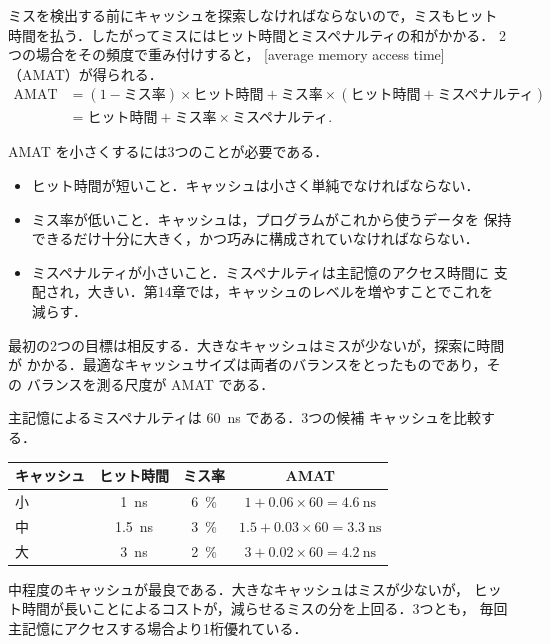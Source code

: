 \documentclass[../main.tex]{subfiles}
\begin{document}
ミスを検出する前にキャッシュを探索しなければならないので，ミスもヒット
時間を払う．したがってミスにはヒット時間とミスペナルティの和がかかる．
2つの場合をその頻度で重み付けすると，
[average memory access time]%
（AMAT）が得られる．
\begin{equation}
  \begin{aligned}
    \text{AMAT}
    &= (1-\text{ミス率}) \times \text{ヒット時間}
       + \text{ミス率} \times (\text{ヒット時間} + \text{ミスペナルティ}) \\
    &= \text{ヒット時間} + \text{ミス率} \times \text{ミスペナルティ} .
  \end{aligned}
  \label{eq:l12-amat}
\end{equation}

AMAT を小さくするには3つのことが必要である．
\begin{itemize}
  \item ヒット時間が短いこと．キャッシュは小さく単純でなければならない．
  \item ミス率が低いこと．キャッシュは，プログラムがこれから使うデータを
    保持できるだけ十分に大きく，かつ巧みに構成されていなければならない．
  \item ミスペナルティが小さいこと．ミスペナルティは主記憶のアクセス時間に
    支配され，大きい．第14章では，キャッシュのレベルを増やすことでこれを
    減らす．
\end{itemize}
最初の2つの目標は相反する．大きなキャッシュはミスが少ないが，探索に時間が
かかる．最適なキャッシュサイズは両者のバランスをとったものであり，その
バランスを測る尺度が AMAT である．

\begin{example}
  \label{ex:l12-amat}
  主記憶によるミスペナルティは \SI{60}{\nano\second} である．3つの候補
  キャッシュを比較する．
  \begin{center}\small
    \begin{tabular}{@{}lccc@{}}
      \toprule
      キャッシュ & ヒット時間 & ミス率 & AMAT \\
      \midrule
      小 & \SI{1}{\nano\second}   & \SI{6}{\percent} & $1 + 0.06\times 60 = \SI{4.6}{\nano\second}$ \\
      中 & \SI{1.5}{\nano\second} & \SI{3}{\percent} & $1.5 + 0.03\times 60 = \SI{3.3}{\nano\second}$ \\
      大 & \SI{3}{\nano\second}   & \SI{2}{\percent} & $3 + 0.02\times 60 = \SI{4.2}{\nano\second}$ \\
      \bottomrule
    \end{tabular}
  \end{center}
  中程度のキャッシュが最良である．大きなキャッシュはミスが少ないが，
  ヒット時間が長いことによるコストが，減らせるミスの分を上回る．3つとも，
  毎回主記憶にアクセスする場合より1桁優れている．
\end{example}
\end{document}
